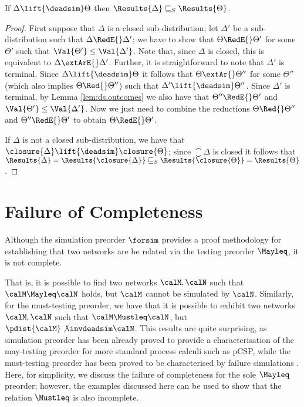 \documentclass{LMCS}
\begin{document}
\begin{cor}
\label{cor:ds.outcomes}
If $\Delta \lift{\deadsim} \Theta$ then 
$\Results{\Delta} \sqsubseteq_S \Results{\Theta}$. 
\end{cor}
\begin{proof}
First suppose that $\Delta$ is a closed sub-distribution; 
let $\Delta'$ be a sub-distribution such that 
$\Delta \RedE{} \Delta'$; we have to show that 
$\Theta \RedE{} \Theta'$ for some $\Theta'$ such that 
$\Val{\Theta'} \leq \Val{\Delta'}$.
Note that, since $\Delta$ is 
closed, this is equivalent to $\Delta \extArE{} \Delta'$. 
Further, it is straightforward to note that $\Delta'$ is 
terminal. Since $\Delta \lift{\deadsim} \Theta$ it follows 
that $\Theta \extAr{} \Theta''$ for some $\Theta''$ 
(which also implies $\Theta \Red{} \Theta''$)
such that $\Delta' \lift{\deadsim} \Theta''$. 
Since $\Delta'$ is terminal, by Lemma 
\ref{lem:ds.outcomes} we also have that 
$\Theta'' \RedE{} \Theta'$ and $\Val{\Theta'} \leq 
\Val{\Delta'}$. Now we just need to combine the 
reductions $\Theta \Red{} \Theta''$ and 
$\Theta'' \RedE{} \Theta'$ to obtain $\Theta \RedE{} \Theta'$.

If $\Delta$ is not a closed sub-distribution, we have 
that $\closure{\Delta} \lift{\deadsim} \closure{\Theta}$; 
since $\closure{\Delta}$ is closed it follows that 
$\Results{\Delta} = \Results{\closure{\Delta}} \sqsubseteq_{S} 
\Results{\closure{\Theta}} = \Results{\Theta}$.
\end{proof}


\section{Failure of Completeness}
\label{sec:completeness}

Although the simulation preorder $\forsim$ provides a proof
methodology for establishing 
 that two networks are be related via
the testing preorder $\Mayleq$, it is not complete.
 
That is, it is possible to find two networks $\calM, \calN$
such that $\calM \Mayleq \calN$ holds, but $\calM$ cannot be simulated
by $\calN$. 
Similarly, for the must-testing preorder, we have that 
it is possible to exhibit two networks $\calM, \calN$ 
such that $\calM \Mustleq \calN$, but $\pdist{\calM} \not\invdeadsim 
\calN$. 
This results are quite surprising, as simulation preorder has been
already proved to provide a characterisation of the may-testing
preorder for more standard process calculi such as pCSP, 
while the must-testing preorder has been proved to be characterised 
by failure simulations \cite{DGHM09full}. 
Here, for simplicity, we discuss the failure of completeness 
for the sole $\Mayleq$ preorder; however, the examples discussed 
here can be used to show that the relation $\Mustleq$ is also 
incomplete.
  
\end{document}
